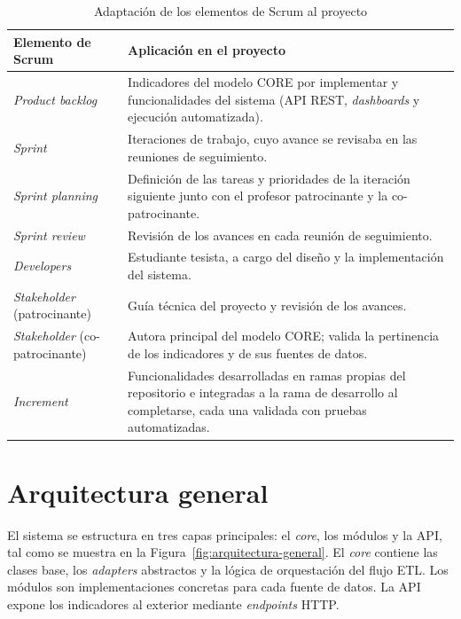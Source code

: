 \documentclass[12pt,letterpaper,oneside]{report}
\begin{document}
\begin{table}[H]
\centering
\caption{Adaptaci\'on de los elementos de Scrum al proyecto}
\label{tab:adaptacion-scrum}
\begin{tabular}{|p{4cm}|p{9.5cm}|}
\hline
\textbf{Elemento de Scrum} & \textbf{Aplicaci\'on en el proyecto} \\
\hline
\textit{Product backlog} & Indicadores del modelo CORE por implementar y funcionalidades del sistema (API REST, \textit{dashboards} y ejecuci\'on automatizada). \\
\hline
\textit{Sprint} & Iteraciones de trabajo, cuyo avance se revisaba en las reuniones de seguimiento. \\
\hline
\textit{Sprint planning} & Definici\'on de las tareas y prioridades de la iteraci\'on siguiente junto con el profesor patrocinante y la co-patrocinante. \\
\hline
\textit{Sprint review} & Revisi\'on de los avances en cada reuni\'on de seguimiento. \\
\hline
\textit{Developers} & Estudiante tesista, a cargo del dise\~no y la implementaci\'on del sistema. \\
\hline
\textit{Stakeholder} (patrocinante) & Gu\'ia t\'ecnica del proyecto y revisi\'on de los avances. \\
\hline
\textit{Stakeholder} (co-patrocinante) & Autora principal del modelo CORE; valida la pertinencia de los indicadores y de sus fuentes de datos. \\
\hline
\textit{Increment} & Funcionalidades desarrolladas en ramas propias del repositorio e integradas a la rama de desarrollo al completarse, cada una validada con pruebas automatizadas. \\
\hline
\end{tabular}
\end{table}

\section{Arquitectura general}
\label{sec:arquitectura}

El sistema se estructura en tres capas principales: el \textit{core}, los m\'odulos y la API, tal como se muestra en la Figura~\ref{fig:arquitectura-general}. El \textit{core} contiene las clases base, los \textit{adapters} abstractos y la l\'ogica de orquestaci\'on del flujo ETL. Los m\'odulos son implementaciones concretas para cada fuente de datos. La API expone los indicadores al exterior mediante \textit{endpoints} HTTP.
\end{document}
